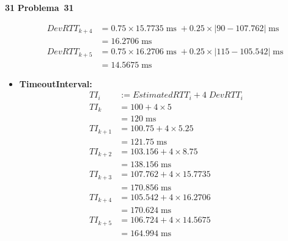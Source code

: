 \documentclass{article}
\newcounter{exe-list}
\newenvironment{exe}[2][Problema]
    {\newcommand{\opt}{(Opcional)}%
    \newcommand{\sketch}[1]{{\bfseries Rascunho:} ##1}%
    \medskip\par\noindent\ifthenelse{\equal{#1}{}}
        {\textbf{\large #2}}
        {\textbf{\large #1~#2}}%
    \medskip\par\noindent}
    {\medskip}
\DeclareMathOperator{\ms}{ms}
\begin{document}
\begin{exe}{31}
\begin{itemize}
\begin{align*}
                DevRTT_{k+4} &= 0.75 \times 15.7735 \ms
                    + 0.25 \times |90 - 107.762| \ms \\
                &= 16.2706 \ms \\
                DevRTT_{k+5} &= 0.75 \times 16.2706 \ms
                    + 0.25 \times |115 - 105.542| \ms \\
                &= 14.5675 \ms
            \end{align*}
        \item \textbf{TimeoutInterval:}
            \begin{align*}
                TI_i &:= EstimatedRTT_i + 4 \; DevRTT_i \\
                TI_k &= 100 + 4 \times 5 \\
                &= 120 \ms \\
                TI_{k+1} &= 100.75 + 4 \times 5.25 \\
                &= 121.75 \ms \\
                TI_{k+2} &= 103.156 + 4 \times 8.75 \\
                &= 138.156 \ms \\
                TI_{k+3} &= 107.762 + 4 \times 15.7735 \\
                &= 170.856 \ms \\
                TI_{k+4} &= 105.542 + 4 \times 16.2706 \\
                &= 170.624 \ms \\
                TI_{k+5} &= 106.724 + 4 \times 14.5675 \\
                &= 164.994 \ms
            \end{align*}
    \end{itemize}
\end{exe}
\end{document}
